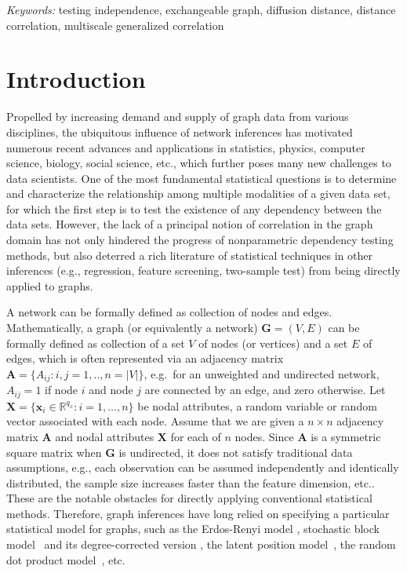 \documentclass[11pt]{article}
\theoremstyle{definition}
\begin{document}
\noindent%
{\it Keywords:} testing independence, exchangeable graph, diffusion distance, distance correlation, multiscale generalized correlation

\sloppy
\doublespacing

\section{Introduction}
\label{sec:intro}
	\vspace*{-0.2cm}
Propelled by increasing demand and supply of graph data from various disciplines, the ubiquitous influence of network inferences has motivated numerous recent advances and applications in statistics, physics, computer science, biology, social science, etc., which further poses many new challenges to data scientists. One of the most fundamental statistical questions is to determine and characterize the relationship among multiple modalities of a given data set, for which the first step is to test the existence of any dependency between the data sets. However, the lack of a principal notion of correlation in the graph domain has not only hindered the progress of nonparametric dependency testing methods, but also deterred a rich literature of statistical techniques in other inferences (e.g., regression, feature screening, two-sample test) from being directly applied to graphs.
 
A network can be formally defined as collection of nodes and edges.
Mathematically, a graph (or equivalently a network) $\mathbf{G}=(V,E)$ can be formally defined as collection of a set $V$ of nodes (or vertices) and a set $E$ of edges, which is often represented via an adjacency matrix $\mathbf{A} = \{A_{ij} : i,j= 1,..,n = |V| \}$, e.g.~for an unweighted and undirected network, $A_{ij} = 1$ if node $i$ and node $j$ are connected by an edge, and zero otherwise. Let $\mathbf{X} = \{  \mathbf{x}_{i} \in \mathbb{R}^{q_{x}} : i = 1, \ldots, n \}$ be nodal attributes, a random variable or random vector associated with each node. Assume that we are given a $n \times n$ adjacency matrix $\mathbf{A}$ and nodal attributes $\mathbf{X}$ for each of $n$ nodes. Since $\mathbf{A}$ is a symmetric square matrix when $\mathbf{G}$ is undirected, it does not satisfy traditional data assumptions, e.g., each observation can be assumed independently and identically distributed, the sample size increases faster than the feature dimension, etc.. These are the notable obstacles for directly applying conventional statistical methods. Therefore, graph inferences have long relied on specifying a particular statistical model for graphs, such as the Erdos-Renyi model \cite{erdosrenyi1959,Gilbert1959}, stochastic block model~\cite{HollandEtAl1983, rohe2011spectral,SussmanEtAl2012,Lei2015} and its degree-corrected version \cite{karrer2011stochastic, ZhaoLevinaZhu2012}, the latent position model~\cite{TangSussmanPriebe2013,fosdick2015testing}, the random dot product model~\cite{YoungScheinerman2007, sussman2014consistent}, etc. 
\end{document}

